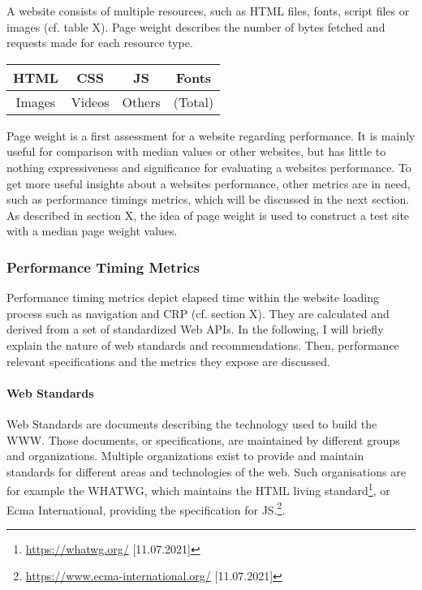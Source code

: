 A website consists of multiple resources, such as HTML files, fonts, script files or images (cf. table X).
Page weight describes the number of bytes fetched and requests made for each resource type. %

\begin{center}
\begin{tabular}{| c | c | c | c | }
\hline
HTML & CSS  & JS & Fonts \\
\hline
Images & Videos & Others & (Total) \\
\hline
\end{tabular}
\end{center}

Page weight is a first assessment for a website regarding performance.
It is mainly useful for comparison with median values or other websites, but has little to nothing expressiveness and significance for evaluating a websites performance.
To get more useful insights about a websites performance, other metrics are in need, such as performance timings metrics, which will be discussed in the next section.
As described in section X,  the idea of page weight is used to construct a test site with a median page weight values.




\subsubsection{Performance Timing Metrics}

Performance timing metrics depict elapsed time within the website loading process such as navigation and CRP (cf.  section X).
They are calculated and derived from a set of standardized Web APIs.
In the following, I will briefly explain the nature of web standards and recommendations.
Then, performance relevant specifications and the metrics they expose are discussed.


\paragraph{Web Standards}

Web Standards are documents describing the technology used to build the WWW. %
Those documents, or specifications, are maintained by different groups and organizations.
Multiple organizations exist to provide and maintain standards for different areas and technologies of the web.
Such organisations are for example the WHATWG, which maintains the HTML living standard\footnote{\url{https://whatwg.org/} [11.07.2021]}, or Ecma International, providing the specification for JS.\footnote{\url{https://www.ecma-international.org/} [11.07.2021]}.

